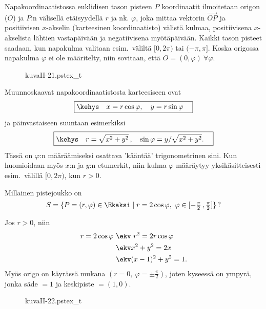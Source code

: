 Napakoordinaatistossa euklidisen tason pisteen $P$ koordinaatit ilmoitetaan origon ($O$) ja 
$P$:n välisellä etäisyydellä $r$ ja nk. 
%
 $\varphi$, joka mittaa vektorin $\overrightarrow{OP}$ ja positiivisen
$x$-akselin (karteesinen koordinaatisto) välistä kulmaa, positiivisena $x$-akselista lähtien
vastapäivään ja negatiivisena myötäpäivään. Kaikki tason pisteet saadaan, kun napakulma
valitaan esim.\ väliltä $[0,2\pi)$ tai $(-\pi,\pi]$. Koska origossa napakulma $\varphi$ ei ole
määritelty, niin sovitaan, että $O=(0,\varphi)\ \forall\varphi$.
\begin{figure}[H]
\begin{center}
{kuvaII-21.pstex_t}
\end{center}
\end{figure}
Muunnoskaavat napakoordinaatistosta karteesiseen ovat
\[
\boxed{\kehys\quad x=r\cos{\varphi}, \quad y=r\sin{\varphi} \quad}
\]
ja päinvastaiseen suuntaan esimerkiksi
\[
\boxed{\kehys\quad r=\sqrt{x^2 + y^2}\,, \quad \sin{\varphi}=y/\sqrt{x^2 + y^2}. \quad}
\]
Tässä on $\varphi$:n määräämiseksi osattava 'kääntää' trigonometrinen sini. Kun huomioidaan myös
$x$:n ja $y$:n etumerkit, niin kulma $\varphi$ määräytyy yksikäsitteisesti esim.\ välillä 
$[0,2\pi)$, kun $r>0$. 
\begin{Exa}
Millainen pistejoukko on
\[
S=\{P=(r,\varphi) \in \Ekaksi \mid r=2\cos\varphi, \ 
                   \varphi\in[-\tfrac{\pi}{2}\,,\tfrac{\pi}{2}]\}\,?
\]
\end{Exa}
\ratk Jos $r > 0$, niin
\begin{align*}
r=2\cos{\varphi} \ &\ekv \ r^2=2r\cos{\varphi} \\
&\ekv x^2+y^2=2x \\
&\ekv (x-1)^2+y^2=1.
\end{align*}
Myös origo on käyrässä mukana $(r=0, \ \varphi=\pm\frac{\pi}{2})$, joten kyseessä on ympyrä,
jonka säde $=1$ ja keskipiste $=(1,0)$. \loppu
\begin{figure}[H]
\begin{center}
{kuvaII-22.pstex_t}
\end{center}
\end{figure}

